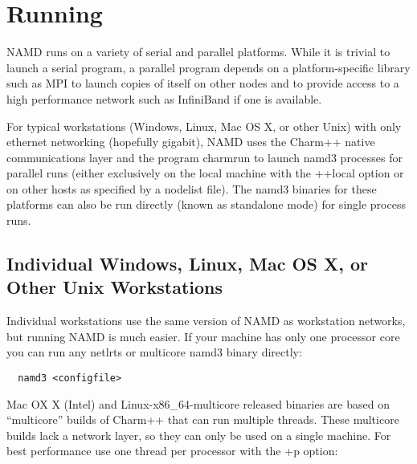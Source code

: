 
\section{Running \NAMD}
\label{section:run}

NAMD runs on a variety of serial and parallel platforms.  While it is
trivial to launch a serial program, a parallel program depends on a
platform-specific library such as MPI to launch copies of itself on
other nodes and to provide access to a high performance network such as 
InfiniBand if one is available.

For typical workstations (Windows, Linux, Mac OS X, or other Unix)
with only ethernet networking (hopefully gigabit), NAMD uses the
Charm++ native communications layer and the program charmrun to launch
namd3 processes for parallel runs (either exclusively on the local
machine with the ++local option or on other hosts as specified by a
nodelist file).  The namd3 binaries for these platforms can also be
run directly (known as standalone mode) for single process runs.

\subsection{Individual Windows, Linux, Mac OS X, or Other Unix Workstations}

Individual workstations use the same version of NAMD as workstation
networks, but running NAMD is much easier.  If your machine has only
one processor core you can run any netlrts or multicore namd3 binary
directly:

\begin{verbatim}
  namd3 <configfile>
\end{verbatim}

Mac OX X (Intel) and Linux-x86\_64-multicore released binaries
are based on ``multicore'' builds of Charm++ that can run multiple threads.
These multicore builds lack a network layer, so they can only be used on a
single machine.
For best performance use one thread per processor with the +p option:

